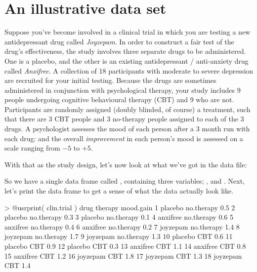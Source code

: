 \section{An illustrative data set~\label{sec:anxifree}}

Suppose you've become involved in a clinical trial in which you are testing a new antidepressant drug called {\it Joyzepam}. In order to construct a fair test of the drug's effectiveness, the study involves three separate drugs to be administered. One is a placebo, and the other is an existing antidepressant / anti-anxiety drug called {\it Anxifree}. A collection of 18 participants with moderate to severe depression are recruited for your initial testing. Because the drugs are sometimes administered in conjunction with psychological therapy, your study includes 9 people undergoing cognitive behavioural therapy (CBT) and 9 who are not. Participants are randomly assigned (doubly blinded, of course) a treatment, such that there are 3 CBT people and 3 no-therapy people assigned to each of the 3 drugs. A psychologist assesses the mood of each person after a 3 month run with each drug: and the overall {\it improvement} in each person's mood is assessed on a scale ranging from $-5$ to $+5$. 

With that as the study design, let's now look at what we've got in the data file:
So we have a single data frame called , containing three variables; ,  and . Next, let's print the data frame to get a sense of what the data actually look like. 

\begin{rblock1}     
> @usr{print( clin.trial )}   
       drug    therapy mood.gain
1   placebo no.therapy       0.5
2   placebo no.therapy       0.3
3   placebo no.therapy       0.1
4  anxifree no.therapy       0.6
5  anxifree no.therapy       0.4
6  anxifree no.therapy       0.2
7  joyzepam no.therapy       1.4
8  joyzepam no.therapy       1.7
9  joyzepam no.therapy       1.3
10  placebo        CBT       0.6
11  placebo        CBT       0.9
12  placebo        CBT       0.3
13 anxifree        CBT       1.1
14 anxifree        CBT       0.8
15 anxifree        CBT       1.2
16 joyzepam        CBT       1.8
17 joyzepam        CBT       1.3
18 joyzepam        CBT       1.4
\end{rblock1}

